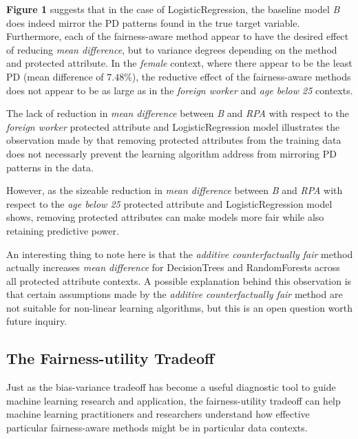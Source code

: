 \documentclass{acm_proc_article-sp}
\begin{document}
\textbf{Figure 1} suggests that in the case of LogisticRegression, the baseline
model \emph{B} does indeed mirror the PD patterns found in the true target
variable. Furthermore, each of the fairness-aware method appear to have
the desired effect of reducing \emph{mean difference}, but to variance degrees
depending on the method and protected attribute. In the \emph{female} context,
where there appear to be the least PD (mean difference of \(7.48\%\)), the
reductive effect of the fairness-aware methods does not appear to be as
large as in the \emph{foreign worker} and \emph{age below 25} contexts.

The lack of reduction in \emph{mean difference} between \emph{B} and \emph{RPA}
with respect to the \emph{foreign worker} protected attribute and
LogisticRegression model illustrates the observation made by
\cite{kusner2017counterfactual} that removing protected attributes from the
training data does not necessarly prevent the learning algorithm address from
mirroring PD patterns in the data.

However, as the sizeable reduction in \emph{mean difference} between \emph{B}
and \emph{RPA} with respect to the \emph{age below 25} protected attribute and
LogisticRegression model shows, removing protected attributes can make models
more fair while also retaining predictive power.

An interesting thing to note here is that the \emph{additive counterfactually
fair} method actually increases \emph{mean difference} for DecisionTrees and
RandomForests across all protected attribute contexts. A possible explanation
behind this observation is that certain assumptions made by the \emph{additive
counterfactually fair} method are not suitable for non-linear learning
algorithms, but this is an open question worth future inquiry.

\subsection{The Fairness-utility Tradeoff}

Just as the bias-variance tradeoff has become a useful diagnostic tool to guide
machine learning research and application, the fairness-utility tradeoff can
help machine learning practitioners and researchers understand how effective
particular fairness-aware methods might be in particular data contexts.
\end{document}
